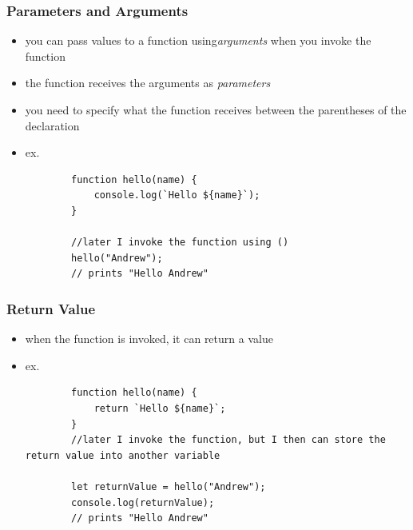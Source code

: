\documentclass{beamer}
\begin{document}
\begin{frame}[fragile]
	\frametitle{Parameters and Arguments}
	\begin{itemize}
		\item you can pass values to a function using\emph{arguments} when you invoke the function
		\item the function receives the arguments as \emph{parameters}
		\item you need to specify what the function receives between the parentheses of the declaration
		\item ex. \begin{lstlisting}
		function hello(name) {
			console.log(`Hello ${name}`);
		}

		//later I invoke the function using ()
		hello("Andrew");
		// prints "Hello Andrew"
		\end{lstlisting}
	\end{itemize}
\end{frame}

\begin{frame}[fragile]
\frametitle{Return Value}
	\begin{itemize}
		\item when the function is invoked, it can return a value
		\item ex. \begin{lstlisting}
		function hello(name) {
			return `Hello ${name}`;
		}
		//later I invoke the function, but I then can store the return value into another variable

		let returnValue = hello("Andrew");
		console.log(returnValue);
		// prints "Hello Andrew"
		\end{lstlisting}
	\end{itemize}
\end{frame}
\end{document}

